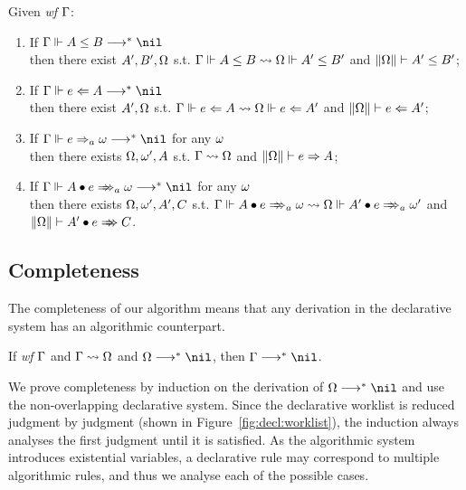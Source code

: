 \begin{corollary}
Given \emph{wf }$\Gamma$:
\begin{enumerate}
    \item If $\Gm \Vdash A \le B \redto \nil$\\
        then there exist $A', B', \Omega$ s.t.
        $\Gamma \Vdash A \le B \rightsquigarrow \Omega \Vdash A' \le B'$ and $\|\Omega\| \vdash A' \le B'$;
    \item If $\Gm \Vdash e \Lto A \redto \nil$\\
        then there exist $ A', \Omega$ s.t.
        $\Gamma \Vdash e \Leftarrow A \rightsquigarrow \Omega \Vdash e \Leftarrow A'$ and $\|\Omega\| \vdash e \Leftarrow A'$;
    \item If $\Gm \Vdash e \To_a \jg \redto \nil$ for any $\omega$\\
        then there exists $\Omega, \omega', A$ s.t.
        $\Gamma \rightsquigarrow \Omega$ and $\|\Omega\| \vdash e \Rightarrow A$;
    \item If $\Gm \Vdash \appInfAlg{A}{e} \redto \nil$ for any $\omega$\\
        then there exists $\Omega, \omega', A', C$ s.t.
        $\Gm \Vdash \appInfAlg{A}{e} \sto \Om \Vdash \appInfAlg{A'}{e}[a][\jg']$
            and $\|\Om\| \vdash \appInf{A'}{e}{C}$.
\end{enumerate}
\end{corollary}

\subsection{Completeness}

The completeness of our algorithm means that any derivation in the
declarative system has an algorithmic counterpart.

\begin{theorem}[Completeness]
If \emph{wf }$\Gamma$ and $\Gamma\rightsquigarrow\Omega$ and $\Om\redto\nil$, then $\Gm \redto \nil$.
\label{thm:completeness}
\end{theorem}

We prove completeness by induction on the derivation of $\Om\redto\nil$
and use the non-overlapping declarative system.
Since the declarative worklist is reduced judgment by judgment
(shown in Figure~\ref{fig:decl:worklist}),
the induction always analyses the first judgment until it is satisfied.
As the algorithmic system introduces existential variables,
a declarative rule may correspond to multiple algorithmic rules,
and thus we analyse each of the possible cases.

